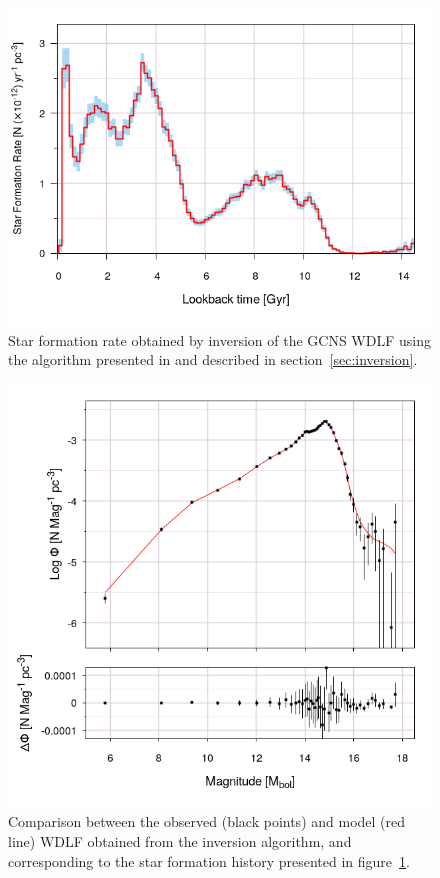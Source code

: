 \documentclass[fleqn,usenatbib]{mnras}
\begin{document}
\begin{figure}
    \includegraphics[width=\columnwidth]{figures/nr_sfr.png}
    \caption{Star formation rate obtained by inversion of the GCNS WDLF using the
    algorithm presented in \citet{2013MNRAS.434.1549R} and described in 
    section~\ref{sec:inversion}.}
    \label{fig:nr_sfr}
\end{figure}

\begin{figure}
    \includegraphics[width=\columnwidth]{figures/nr_wdlf.png}
    \caption{Comparison between the observed (black points) and model (red line)
    WDLF obtained from the inversion algorithm, and corresponding to the star
    formation history presented in figure~\ref{fig:nr_sfr}.}
    \label{fig:nr_wdlf}
\end{figure}
\end{document}
